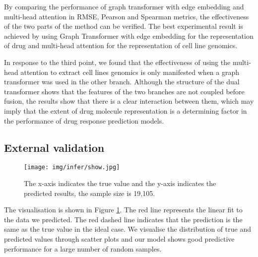 \documentclass{article}
\begin{document}
By comparing the performance of graph transformer with edge embedding and multi-head attention in RMSE, Pearson and Spearman metrics, the effectiveness of the two parts of the method can be verified. The best experimental result is achieved by using Graph Transformer with edge embedding for the representation of drug and multi-head attention for the representation of cell line genomics.



In response to the third point, we found that the effectiveness of using the multi-head attention to extract cell lines genomics is only manifested when a graph transformer was used in the other branch. Although the structure of the dual transformer shows that the features of the two branches are not coupled before fusion, the results show that there is a clear interaction between them, which may imply that the extent of drug molecule representation is a determining factor in the performance of drug response prediction models.







\subsection{External validation}













\begin{figure}  \centering
\texttt{[image: img/infer/show.jpg]} 
\caption{The x-axis indicates the true value and the y-axis indicates the predicted results, the sample size is 19,105. }
\label{fig:showtest}
\end{figure}
The visualisation is shown in Figure \ref{fig:showtest}. The red line represents the linear fit to the data we predicted.
The red dashed line indicates that the prediction is the same as the true value in the ideal case.
We visualise the distribution of true and predicted values through scatter plots and our model shows good predictive performance for a large number of random samples.
\end{document}
